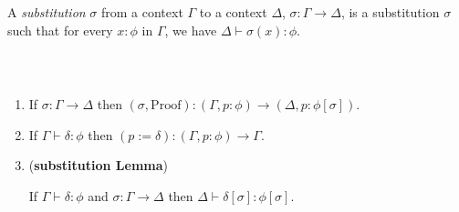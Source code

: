 {\begin{code}
\>[74]\<%
\\
\>[0]\<[2]%
\>[2]\AgdaSymbol{(} \AgdaSymbol{\{} \AgdaInductiveConstructor{,} \AgdaSymbol{\}} \AgdaSymbol{\{} \AgdaInductiveConstructor{,} \AgdaSymbol{\}} \AgdaSymbol{\{}  \AgdaSymbol{\}} \AgdaSymbol{\{}  \AgdaSymbol{\}} \AgdaSymbol{\{}  \AgdaSymbol{\}} \AgdaSymbol{\{}\AgdaSymbol{\}} \AgdaSymbol{\{}\AgdaSymbol{\}} \<[84]%
\>[84]\<%
\\
\>[2]\<[4]%
\>[4] \AgdaSymbol{(} \AgdaSymbol{))}\<%
\end{code}
}
A \emph{substitution} $\sigma$ from a context $\Gamma$ to a context $\Delta$, $\sigma : \Gamma \rightarrow \Delta$,  is a substitution $\sigma$ such that
for every $x : \phi$ in $\Gamma$, we have $\Delta \vdash \sigma(x) : \phi$.

\begin{code}%
\> \AgdaSymbol{:}  \AgdaSymbol{\{}\AgdaSymbol{\}} \AgdaSymbol{\{}\AgdaSymbol{\}}            \<%
\\
\>     \AgdaSymbol{=}       \AgdaSymbol{\_}    \AgdaSymbol{(}  \AgdaSymbol{)}\<%
\end{code}

\begin{lemma}$ $
\begin{enumerate}
\item
If $\sigma : \Gamma \rightarrow \Delta$ then $(\sigma , \mathrm{Proof}) : (\Gamma , p : \phi) \rightarrow (\Delta , p : \phi [ \sigma ])$.
\item
If $\Gamma \vdash \delta : \phi$ then $(p := \delta) : (\Gamma, p : \phi) \rightarrow \Gamma$.
\item
(\textbf{substitution Lemma})

If $\Gamma \vdash \delta : \phi$ and $\sigma : \Gamma \rightarrow \Delta$ then $\Delta \vdash \delta [ \sigma ] : \phi [ \sigma ]$.
\end{enumerate}
\end{lemma}

